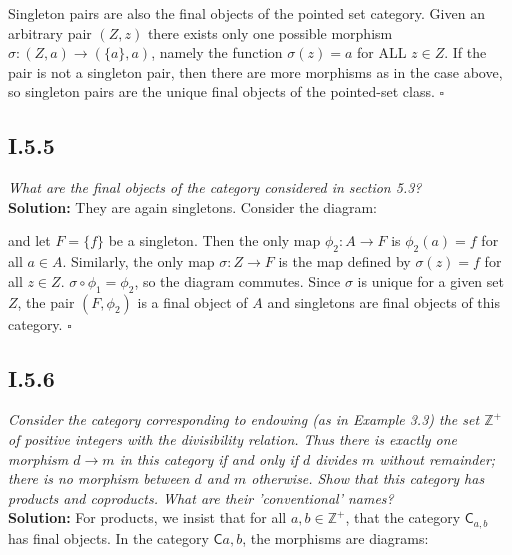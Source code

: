 \documentclass[11pt,a4paper]{article}
\begin{document}
\noindent Singleton pairs are also the final objects of the pointed set category.  Given an arbitrary pair $(Z, z)$ there exists only one possible morphism $\sigma:(Z,a)\rightarrow (\{a\},a)$, namely the function $\sigma(z) = a$ for ALL $z \in Z$. If the pair is not a singleton pair, then there are more morphisms as in the case above, so singleton pairs are the unique final objects of the pointed-set class. $\square$

\subsection*{I.5.5} \textit{What are the final objects of the category considered in section 5.3?}\\

\noindent \textbf{Solution: } They are again singletons.  Consider the diagram:

\begin{center}
\end{center}

\noindent and let $F = \{f\}$ be a singleton.  Then the only map $\phi_2: A \rightarrow F$ is $\phi_2(a) = f$ for all $a \in A$.  Similarly, the only map $\sigma:Z \rightarrow F$ is the map defined by $\sigma(z) = f$ for all $z \in Z$.  $\sigma \circ \phi_1 = \phi_2$, so the diagram commutes.  Since $\sigma$ is unique for a given set $Z$, the pair $(F, \phi_2)$ is a final object of $A$ and singletons are final objects of this category. $\square$

\subsection*{I.5.6} \textit{Consider the category corresponding to endowing (as in Example 3.3) the set $\mathbb{Z}^+$ of positive integers with the divisibility relation.  Thus there is exactly one morphism $d \rightarrow m$ in this category if and only if $d$ divides $m$ without remainder; there is no morphism between $d$ and $m$ otherwise.  Show that this category has products and coproducts.  What are their 'conventional' names?} \\

\noindent \textbf{Solution: }  For products, we insist that for all $a,b \in \mathbb{Z}^+$, that the category $\textsf{C}_{a,b}$ has final objects.  In the category $\textsf{C}{a,b}$, the morphisms are diagrams:
\end{document}
